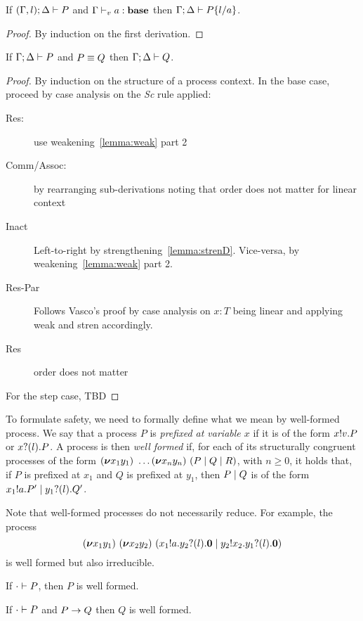 \begin{lemma}[Substitution]\mbox{}
  If $(\Gamma, l);\Delta \vdash P$ and ${\Gamma \vdash_v a : \mathbf{base}}$ then
  \( \Gamma;\Delta \vdash P\{l/a\} \).
\end{lemma}
\begin{proof}
  By induction on the first derivation.
\end{proof}
\begin{lemma}
  If \( \Gamma;\Delta \vdash P \) and \( P \equiv Q \) then \( \Gamma;\Delta \vdash Q \).
\end{lemma}
\begin{proof}
  By induction on the structure of a process context. In the base case, proceed by case analysis on the \textsl{Sc} rule applied:
  \begin{description}
  \item[Res:] use weakening~\ref{lemma:weak} part 2
  \item[Comm/Assoc:] by rearranging sub-derivations noting that  order does not matter for linear context
  \item[Inact] Left-to-right by
    strengthening~\ref{lemma:strenD}. Vice-versa, by weakening~\ref{lemma:weak} part 2.
  \item[Res-Par] Follows Vasco's proof by case analysis on $x : T$ being linear and applying weak and stren accordingly.
  \item[Res] order does not matter
  \end{description}
  For the step case, TBD
\end{proof}

To formulate safety, we need to formally define what we mean by well-formed process.
We say that a process \( P \) is \emph{prefixed at variable \( x \)} if it is of the form \( x ! v . P \) or \( x ? (l) . P \).
A process is then \emph{well formed} if, for each of its structurally congruent processes of the form \( (\bm{\nu} x_1y_1)~\dots (\bm{\nu} x_ny_n)~(P \mid Q \mid R) \), with \( n \geq 0 \), it holds that, if \( P \) is prefixed at \( x_1 \) and \( Q \) is prefixed at \( y_1 \), then \( P \mid Q \) is of the form \( x_1 ! a . P' \mid y_1 ? (l) . Q' \).

Note that well-formed processes do not necessarily reduce. For example, the process
\begin{equation*}
  (\bm{\nu} x_1y_1)~(\bm{\nu} x_2y_2)~(x_1 ! a . y_2 ? (l) . \bm{0} \mid y_2 ! x_2 . y_1 ? (l) . \bm{0})
\end{equation*}
is well formed but also irreducible.

\begin{theorem}
  If \( \cdot \vdash P \), then \( P \) is well formed.
\end{theorem}

\begin{corollary}
  If \( \cdot \vdash P \) and \( P \rightarrow Q \) then \( Q \) is well formed.
\end{corollary}